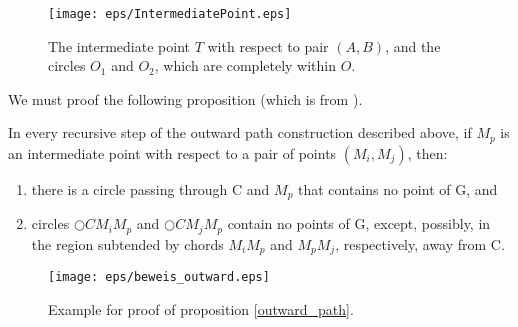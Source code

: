 \begin{figure}[h!]
\centering
\texttt{[image: eps/IntermediatePoint.eps]}
\caption{The intermediate point $T $ with respect to pair $(A,B) $, and the circles $O_1 $ and $O_2 $, which are completely within $O $. }
\label{fig:intermediate_point}
\end{figure}


We must proof the following proposition (which is from \cite{kanj}).

\begin{prop}
\label{outward_path}
In every recursive step of the outward path construction described above, if $M_p $ is an intermediate point with respect to a pair of points $(M_i, M_j) $, then:
\begin{enumerate}
\item there is a circle passing through C and $M_p $ that contains no point of G, and
\item circles $\bigcirc{CM_iM_p} $ and $\bigcirc{CM_jM_p} $ contain no points of G, except, possibly, in the region subtended by chords $M_iM_p $ and $M_pM_j $, respectively, away from C.
\end{enumerate}
\end{prop}

\begin{figure}[h!]
\centering
\texttt{[image: eps/beweis\_outward.eps]}
\caption{Example for proof of proposition \ref{outward_path}.}
\label{fig:outward_path_beweis}
\end{figure}

